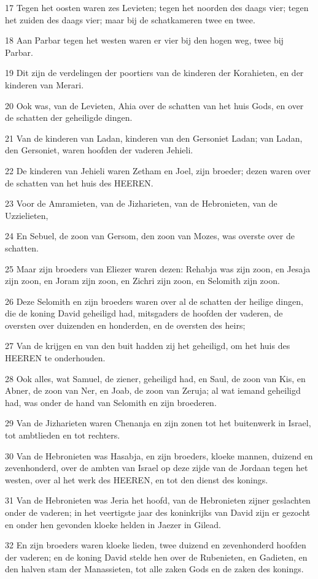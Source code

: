 \par 17 Tegen het oosten waren zes Levieten; tegen het noorden des daags vier; tegen het zuiden des daags vier; maar bij de schatkameren twee en twee.
\par 18 Aan Parbar tegen het westen waren er vier bij den hogen weg, twee bij Parbar.
\par 19 Dit zijn de verdelingen der poortiers van de kinderen der Korahieten, en der kinderen van Merari.
\par 20 Ook was, van de Levieten, Ahia over de schatten van het huis Gods, en over de schatten der geheiligde dingen.
\par 21 Van de kinderen van Ladan, kinderen van den Gersoniet Ladan; van Ladan, den Gersoniet, waren hoofden der vaderen Jehieli.
\par 22 De kinderen van Jehieli waren Zetham en Joel, zijn broeder; dezen waren over de schatten van het huis des HEEREN.
\par 23 Voor de Amramieten, van de Jizharieten, van de Hebronieten, van de Uzzielieten,
\par 24 En Sebuel, de zoon van Gersom, den zoon van Mozes, was overste over de schatten.
\par 25 Maar zijn broeders van Eliezer waren dezen: Rehabja was zijn zoon, en Jesaja zijn zoon, en Joram zijn zoon, en Zichri zijn zoon, en Selomith zijn zoon.
\par 26 Deze Selomith en zijn broeders waren over al de schatten der heilige dingen, die de koning David geheiligd had, mitsgaders de hoofden der vaderen, de oversten over duizenden en honderden, en de oversten des heirs;
\par 27 Van de krijgen en van den buit hadden zij het geheiligd, om het huis des HEEREN te onderhouden.
\par 28 Ook alles, wat Samuel, de ziener, geheiligd had, en Saul, de zoon van Kis, en Abner, de zoon van Ner, en Joab, de zoon van Zeruja; al wat iemand geheiligd had, was onder de hand van Selomith en zijn broederen.
\par 29 Van de Jizharieten waren Chenanja en zijn zonen tot het buitenwerk in Israel, tot ambtlieden en tot rechters.
\par 30 Van de Hebronieten was Hasabja, en zijn broeders, kloeke mannen, duizend en zevenhonderd, over de ambten van Israel op deze zijde van de Jordaan tegen het westen, over al het werk des HEEREN, en tot den dienst des konings.
\par 31 Van de Hebronieten was Jeria het hoofd, van de Hebronieten zijner geslachten onder de vaderen; in het veertigste jaar des koninkrijks van David zijn er gezocht en onder hen gevonden kloeke helden in Jaezer in Gilead.
\par 32 En zijn broeders waren kloeke lieden, twee duizend en zevenhonderd hoofden der vaderen; en de koning David stelde hen over de Rubenieten, en Gadieten, en den halven stam der Manassieten, tot alle zaken Gods en de zaken des konings.

